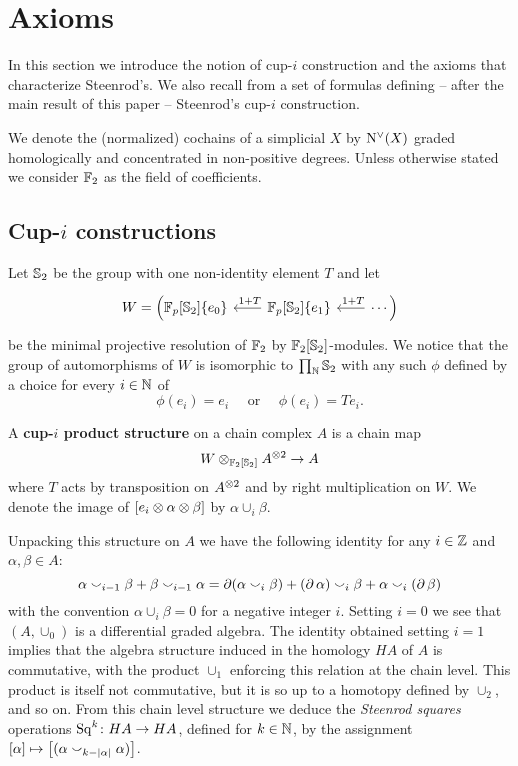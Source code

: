 
\section{Axioms}\label{s:statement}

In this section we introduce the notion of \mbox{cup-$i$} construction and the axioms that characterize Steenrod's.
We also recall from \cite{medina2023fast_sq} a set of formulas defining -- after the main result of this paper -- Steenrod's cup-$i$ construction.

We denote the (normalized) cochains of a simplicial $X$ by $\operatorname{N^{\vee}}(X)$ graded homologically and concentrated in non-positive degrees.
Unless otherwise stated we consider ${\mathbb{F}_2}$ as the field of coefficients.

\subsection{Cup-$i$ constructions}

Let $\mathbb{S}_2$ be the group with one non-identity element $T$ and let
\[
\begin{tikzcd}[column sep=20pt]
W = \Big(
\Fp[\sym_2]\{e_0\} &
\Fp[\sym_2]\{e_1\} \arrow[l, "\ 1+T"'] &
\arrow[l, "\ 1+T"'] \cdots \Big)
\end{tikzcd}
\]
be the minimal projective resolution of ${\mathbb{F}_2}$ by ${\mathbb{F}_2}[\mathbb{S}_2]$-modules.
We notice that the group of automorphisms of $W$ is isomorphic to $\prod_{\mathbb{N}} \mathbb{S}_2$ with any such $\phi$ defined by a choice for every $i \in \mathbb{N}$ of
\[
\phi(e_i) = e_i
\quad \text{ or } \quad
\phi(e_i) = Te_i.
\]

\begin{definition}
	A \textbf{\mbox{cup-$i$} product structure} on a chain complex $A$ is a chain map
	\[
	W \otimes_{{\mathbb{F}_2}[\mathbb{S}_2]} A^{\otimes 2} \to A
	\]
	where $T$ acts by transposition on $A^{\otimes 2}$ and by right multiplication on $W$.
	We denote the image of $[e_i \otimes \alpha \otimes \beta]$ by $\alpha \cup_i \beta$.
\end{definition}

Unpacking this structure on $A$ we have the following identity for any $i \in \mathbb{Z}$ and $\alpha, \beta \in A$:
\[
\alpha \smallsmile_{i-1} \beta + \beta \smallsmile_{i-1} \alpha =
\operatorname{\partial} (\alpha \smallsmile_{i} \beta) + (\operatorname{\partial}\alpha) \smallsmile_{i} \beta + \alpha \smallsmile_{i} (\operatorname{\partial}\beta)
\]
with the convention $\alpha \cup_{i} \beta = 0$ for a negative integer $i$.
Setting $i = 0$ we see that $(A, \cup_0)$ is a differential graded algebra.
The identity obtained setting $i = 1$ implies that the algebra structure induced in the homology $HA$ of $A$ is commutative, with the product $\cup_1$ enforcing this relation at the chain level.
This product is itself not commutative, but it is so up to a homotopy defined by $\cup_2$, and so on.
From this chain level structure we deduce the \textit{Steenrod squares} operations $\operatorname{Sq}^k \colon HA \to HA$, defined for $k \in \mathbb{N}$, by the assignment $[\alpha] \mapsto \big[(\alpha \smallsmile_{k-\lvert\alpha\rvert} \alpha)\big]$.

